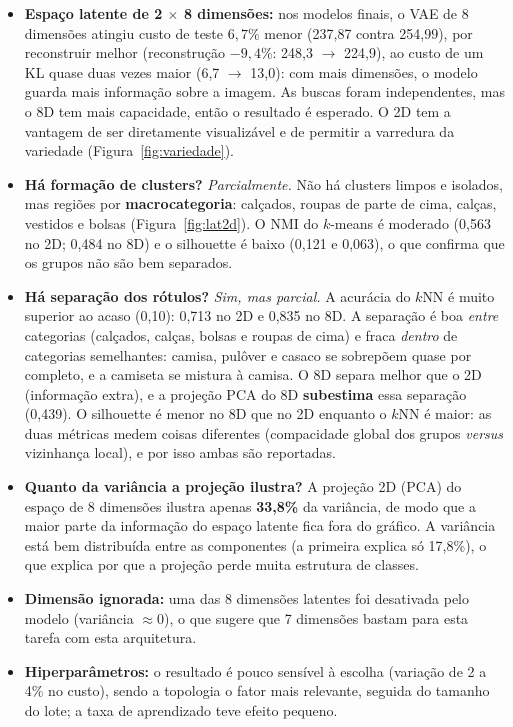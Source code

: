 \documentclass[11pt,a4paper]{article}
\begin{document}
\begin{itemize}
    \item \textbf{Espaço latente de 2 $\times$ 8 dimensões:} nos modelos finais, o VAE de 8 dimensões atingiu custo de teste $6{,}7\%$ menor (237,87 contra 254,99), por reconstruir melhor (reconstrução $-9{,}4\%$: 248,3 $\to$ 224,9), ao custo de um KL quase duas vezes maior (6,7 $\to$ 13,0): com mais dimensões, o modelo guarda mais informação sobre a imagem. As buscas foram independentes, mas o 8D tem mais capacidade, então o resultado é esperado. O 2D tem a vantagem de ser diretamente visualizável e de permitir a varredura da variedade (Figura~\ref{fig:variedade}).
    \item \textbf{Há formação de clusters?} \textit{Parcialmente.} Não há clusters limpos e isolados, mas regiões por \textbf{macrocategoria}: calçados, roupas de parte de cima, calças, vestidos e bolsas (Figura~\ref{fig:lat2d}). O NMI do $k$-means é moderado (0,563 no 2D; 0,484 no 8D) e o silhouette é baixo (0,121 e 0,063), o que confirma que os grupos não são bem separados.
    \item \textbf{Há separação dos rótulos?} \textit{Sim, mas parcial.} A acurácia do $k$NN é muito superior ao acaso (0,10): 0,713 no 2D e 0,835 no 8D. A separação é boa \emph{entre} categorias (calçados, calças, bolsas e roupas de cima) e fraca \emph{dentro} de categorias semelhantes: camisa, pulôver e casaco se sobrepõem quase por completo, e a camiseta se mistura à camisa. O 8D separa melhor que o 2D (informação extra), e a projeção PCA do 8D \textbf{subestima} essa separação (0,439). O silhouette é menor no 8D que no 2D enquanto o $k$NN é maior: as duas métricas medem coisas diferentes (compacidade global dos grupos \emph{versus} vizinhança local), e por isso ambas são reportadas.
    \item \textbf{Quanto da variância a projeção ilustra?} A projeção 2D (PCA) do espaço de 8 dimensões ilustra apenas \textbf{33,8\%} da variância, de modo que a maior parte da informação do espaço latente fica fora do gráfico. A variância está bem distribuída entre as componentes (a primeira explica só 17,8\%), o que explica por que a projeção perde muita estrutura de classes.
    \item \textbf{Dimensão ignorada:} uma das 8 dimensões latentes foi desativada pelo modelo (variância $\approx0$), o que sugere que 7 dimensões bastam para esta tarefa com esta arquitetura.
    \item \textbf{Hiperparâmetros:} o resultado é pouco sensível à escolha (variação de 2 a 4\% no custo), sendo a topologia o fator mais relevante, seguida do tamanho do lote; a taxa de aprendizado teve efeito pequeno.

\end{itemize}
\end{document}
